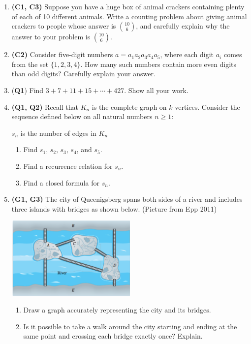 \documentclass[12pt]{article}
\begin{document}
\begin{enumerate}
\item \textbf{(C1, C3)} Suppose you have a huge box of animal crackers containing plenty of each of 10 different animals. Write a counting problem about giving animal crackers to people whose answer is $\textstyle\binom{10}{6}$, and carefully explain why the answer to your problem is $\textstyle\binom{10}{6}$.

\item \textbf{(C2)} Consider five-digit numbers $a = a_1 a_2 a_3 a_4 a_5$, where each digit $a_i$ comes from the set $\{1,2,3,4\}$. How many such numbers contain more even digits than odd digits? Carefully explain your answer.

\item (\textbf{Q1}) Find $3 + 7 + 11 + 15 + \cdots + 427$. Show all your work.

\item \textbf{(Q1, Q2)} Recall that $K_{n}$ is the complete graph on $k$ vertices. Consider the sequence defined below on all natural numbers $n \geq 1$:
\begin{center}
$s_{n}$ is the number of edges in $K_{n}$
\end{center}

\begin{enumerate}
    \item Find $s_{1}$, $s_{2}$, $s_{3}$, $s_{4}$, and $s_{5}$.
    \item Find a recurrence relation for $s_{n}$.
    \item Find a closed formula for $s_{n}$.
\end{enumerate}

\item \textbf{(G1, G3)} The city of Queenigsberg spans both sides of a river and includes three islands with bridges as shown below. (Picture from Epp 2011)

\begin{center}
\includegraphics[width=0.5\textwidth]{bridge_picture.png}
\end{center}

\begin{enumerate}
    \item Draw a graph accurately representing the city and its bridges.
    \item Is it possible to take a walk around the city starting and ending at the same point and crossing each bridge exactly once? Explain.
\end{enumerate}


\end{enumerate}
\end{document}
